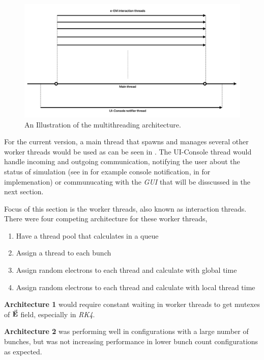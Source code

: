 \documentclass[a4paper,oneside,12pt]{report}
\numberwithin{equation}{chapter}
\begin{document}
\begin{figure}[H]
    \centering
    \includegraphics[width=\linewidth]{./figures/illustrations/multh_arc.png}
    \caption{An Illustration of the multithreading architecture.}
    \label{fig:multh_illustration}
\end{figure}

For the current version, a main thread that spawns and manages several other worker threads would be used as can be seen in .
The UI-Console thread would handle incoming and outgoing communication, notifying the user about the status of simulation 
(see  in  for example console notification,  in  for implemenation)
or communucating with the \textit{GUI} that will be disscussed in the next section.

Focus of this section is the worker threads, also known as \eEM interaction threads.
There were four competing architecture for these worker threads,
\begin{enumerate}
    \item Have a thread pool that calculates \eEM in a queue 
    \item Assign a thread to each bunch
    \item Assign random electrons to each thread and calculate \eEM with global time
    \item Assign random electrons to each thread and calculate \eEM with local thread time
\end{enumerate}

\textbf{Architecture 1} would require constant waiting in worker threads to get mutexes of $\vec{\textbf{E}}$ field, especially in \textit{RK4}.

\textbf{Architecture 2} was performing well in configurations with a large number of bunches, but was not increasing performance in lower bunch count configurations as expected.
\end{document}
